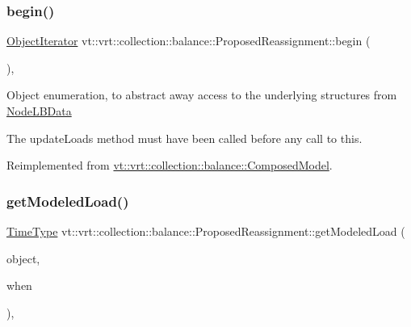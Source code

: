 \subsubsection{\texorpdfstring{begin()}{begin()}}
{\footnotesize\ttfamily \hyperlink{structvt_1_1vrt_1_1collection_1_1balance_1_1_object_iterator}{Object\+Iterator} vt\+::vrt\+::collection\+::balance\+::\+Proposed\+Reassignment\+::begin (\begin{DoxyParamCaption}{ }\end{DoxyParamCaption})\hspace{0.3cm}{\ttfamily [override]}, {\ttfamily [virtual]}}

Object enumeration, to abstract away access to the underlying structures from \hyperlink{structvt_1_1vrt_1_1collection_1_1balance_1_1_node_l_b_data}{Node\+L\+B\+Data}

The {\ttfamily update\+Loads} method must have been called before any call to this. 

Reimplemented from \hyperlink{classvt_1_1vrt_1_1collection_1_1balance_1_1_composed_model_a8f34205887c08a22a1e5bef6ee358f2b}{vt\+::vrt\+::collection\+::balance\+::\+Composed\+Model}.

\mbox{\label{structvt_1_1vrt_1_1collection_1_1balance_1_1_proposed_reassignment_a4ecd2fb3f35cc78f884682a00841d952}} 
\subsubsection{\texorpdfstring{get\+Modeled\+Load()}{getModeledLoad()}}
{\footnotesize\ttfamily \hyperlink{namespacevt_a876a9d0cd5a952859c72de8a46881442}{Time\+Type} vt\+::vrt\+::collection\+::balance\+::\+Proposed\+Reassignment\+::get\+Modeled\+Load (\begin{DoxyParamCaption}\item[{\hyperlink{namespacevt_1_1vrt_1_1collection_1_1balance_a9f5b53fafb270212279a4757d2c4cd28}{Element\+I\+D\+Struct}}]{object,  }\item[{\hyperlink{structvt_1_1vrt_1_1collection_1_1balance_1_1_phase_offset}{Phase\+Offset}}]{when }\end{DoxyParamCaption})\hspace{0.3cm}{\ttfamily [override]}, {\ttfamily [virtual]}}



